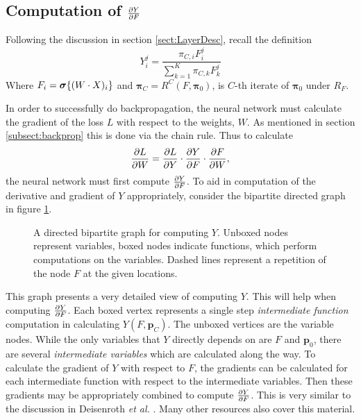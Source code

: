 \subsection{Computation of \( \pdv{Y}{F} \)}\label{subsect:ComputationGraph}
Following the discussion in section \ref{sect:LayerDesc}, recall the definition
\[Y_i^j = \dfrac{{\pi}_{C,i} F_i^j}{\sum_{k=1}^{K} \pi_{C,k} F_k^j}\]
Where $F_i = \bm{\sigma}\{(W\cdot X)_i\}$ and $\bm\pi_C=R^C(F,\bm \pi_0)$, 
is \( C \)-th iterate of \( \bm\pi_0 \) under $R_F$.

In order to successfully do backpropagation, the neural network must calculate the gradient 
of the loss \( L \) with respect to the weights, \(W\). As mentioned in section \ref{subsect:backprop} this is done via the chain rule.  Thus to calculate
\begin{equation}\label{eqn:LossGrad}
	\pdv{L}{W} = \pdv{L}{Y}\cdot\pdv{Y}{F}\cdot\pdv{F}{W},
\end{equation}
the neural network must first compute \( \pdv{Y}{F} \). To aid in computation of the derivative and gradient of \( Y \) appropriately, consider the bipartite directed graph in figure \ref{fig:layerDependencies}.

\begin{figure}[h!]
	\centering
  	
	\caption[Computation Graph for \( Y \)]{A directed bipartite graph for computing \( Y \). Unboxed nodes represent variables, boxed nodes indicate functions, which perform computations on the variables. Dashed lines represent a repetition of the node $F$ at the given locations.}
	\label{fig:layerDependencies}
\end{figure}

This graph presents a very detailed view of computing \( Y \). This will help when computing \( \pdv{Y}{F} \).  Each boxed vertex represents a single step \textit{intermediate function} computation in calculating \( Y(F,\bm p_C) \).  The unboxed vertices are the variable nodes. While the only variables that \( Y \) directly depends on are \( F \) and \( \bm p_0 \), there are several \textit{intermediate variables} which are calculated along the way.  To calculate the gradient of \( Y \) with respect to \( F \), the gradients can be calculated for each intermediate function with respect to the intermediate variables. Then these gradients may be appropriately combined to compute \( \pdv{Y}{F} \).  This is very similar to the discussion in Deisenroth \textit{et al.} \cite[example 5.14]{MML_2019}.  Many other resources also cover this material.

